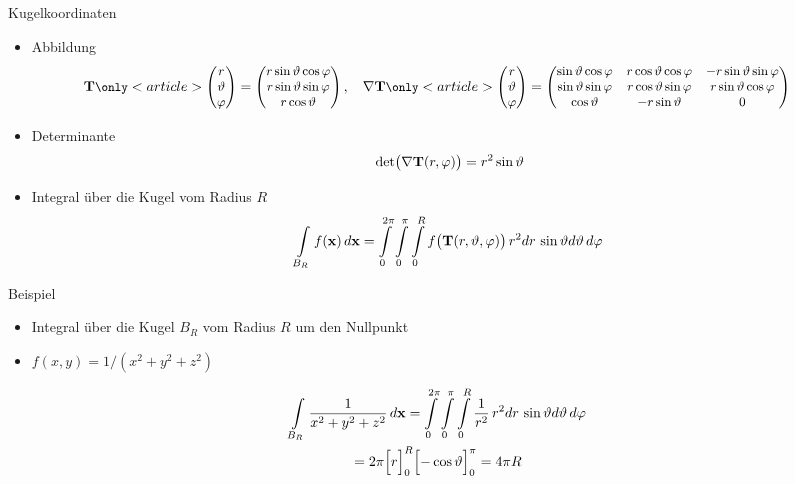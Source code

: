 \begin{frame}{Kugelkoordinaten}
  \begin{itemize}
  \item Abbildung
    \begin{gather*}
      \small
      \hspace{-2em}
      \vT
      \only<article>{\begin{pmatrix}
       r\\\theta\\\phi 
      \end{pmatrix}}
       =
      \begin{pmatrix}
        r\sin\theta\cos\phi\\
        r\sin\theta\sin\phi\\
        r\cos\theta
      \end{pmatrix},\quad
      \nabla \vT
      \only<article>{\begin{pmatrix}
       r\\\theta\\\phi 
      \end{pmatrix}}
      =
      \begin{pmatrix}
        \sin\theta\cos\phi
        &
          r\cos\theta\cos\phi
        &
          -r\sin\theta\sin\phi
        \\
        \sin\theta\sin\phi
        &
          r\cos\theta\sin\phi
        &
          r\sin\theta\cos\phi
        \\
        \cos\theta
        &
          -r\sin\theta
        &
          0
      \end{pmatrix}
    \end{gather*}
  \item Determinante
    \begin{gather*}
      \operatorname{det}\bigl(\nabla \mathbf{T}(r,\varphi)\bigr) = r^2\sin\vartheta
    \end{gather*}
  \item Integral über die Kugel vom Radius $R$
    \begin{gather*}
      \int\limits_{B_R} f(\mathbf{x})\,d\mathbf{x}
      = \int\limits_0^{2\pi}\int\limits_0^{\pi}\int\limits_0^R
      f\bigl(\mathbf{T}(r,\vartheta,\varphi)\bigr) \,r^2dr\,\sin\vartheta d\vartheta\,d\varphi
    \end{gather*}
  \end{itemize}
\end{frame}

\begin{frame}{Beispiel}
  \begin{itemize}
  \item Integral über die Kugel $B_R$ vom Radius $R$ um den Nullpunkt
  \item $f(x,y) = 1/(x^2+y^2+z^2)$
  \end{itemize}
  \begin{multline*}
    \int\limits_{B_R} \frac{1}{x^2+y^2+z^2}\,d\mathbf{x}
    = \int\limits_0^{2\pi}\int\limits_0^{\pi}\int\limits_0^R
    \frac1{r^2} \,r^2dr\,\sin\vartheta d\vartheta\,d\varphi\\
    = 2\pi \Bigl[r\Bigr]_0^R
    \Bigl[-\cos\vartheta\Bigr]_0^\pi = 4\pi R
  \end{multline*}  
\end{frame}


